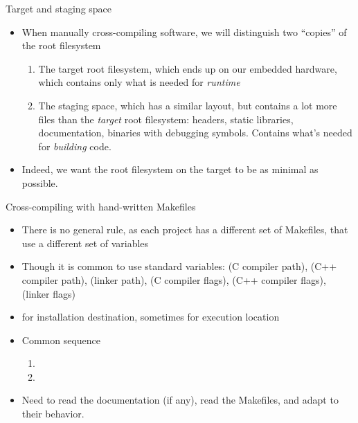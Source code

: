\begin{frame}{Target and staging space}
  \begin{itemize}
  \item When manually cross-compiling software, we will distinguish
    two ``copies'' of the root filesystem
    \begin{enumerate}
    \item The target root filesystem, which ends up on our embedded
      hardware, which contains only what is needed for {\em runtime}
    \item The staging space, which has a similar layout, but contains
      a lot more files than the {\em target} root filesystem: headers,
      static libraries, documentation, binaries with debugging
      symbols. Contains what's needed for {\em building} code.
    \end{enumerate}
  \item Indeed, we want the root filesystem on the target to be as
    minimal as possible.
  \end{itemize}
\end{frame}

\begin{frame}{Cross-compiling with hand-written Makefiles}
  \begin{itemize}
  \item There is no general rule, as each project has a different
    set of Makefiles, that use a different set of variables
  \item Though it is common to use  standard variables:
     (C compiler path),  (C++ compiler path),
     (linker path),  (C compiler flags),
     (C++ compiler flags),  (linker
    flags)
  \item {} for installation destination, sometimes
     for execution location
  \item Common sequence
    \begin{enumerate}
    \item {}
    \item {}
    \end{enumerate}
  \item Need to read the documentation (if any), read the Makefiles,
    and adapt to their behavior.
  \end{itemize}
\end{frame}

